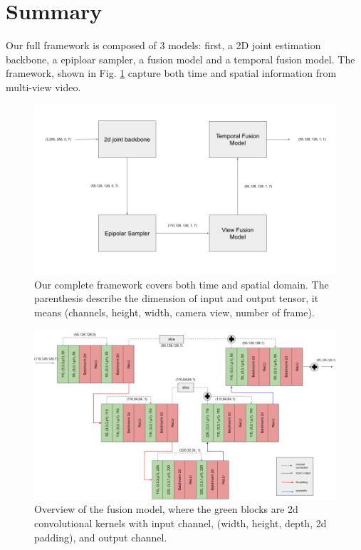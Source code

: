 \section{Summary}
Our full framework is composed of 3 models: first, a 2D joint estimation backbone, a epiploar sampler, a fusion model and a temporal fusion model. The framework, shown in Fig. \ref{fig:full-framework} capture both time and spatial information from multi-view video.
\begin{figure}
	\centering
	\includegraphics[width=0.7\columnwidth]{figures/ch4/full-model.png}
	\caption{Our complete framework covers both time and spatial domain. The parenthesis describe the dimension of input and output tensor, it means (channels, height, width, camera view, number of frame).}
	\label{fig:full-framework}
\end{figure}
\begin{figure}
	\centering
	\includegraphics[width=1.0\columnwidth]{figures/ch4/temporal-fusion.png}
	\caption{Overview of the fusion model, where the green blocks are 2d convolutional kernels with input channel, (width, height, depth, 2d padding), and output channel.}
	\label{fig:view-baseline}
\end{figure}